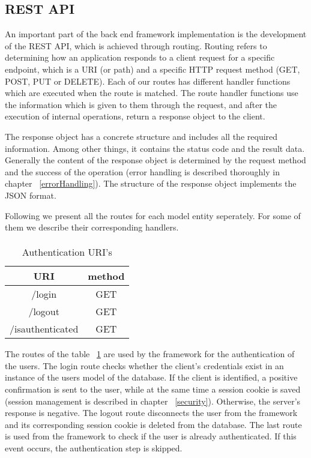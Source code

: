 \subsection{REST API}
An important part of the back end framework implementation is the development of the REST API, which is achieved through routing. Routing refers to determining how an application responds to a client request for a specific endpoint, which is a URI (or path) and a specific HTTP request method (GET, POST, PUT or DELETE). Each of our routes has different handler functions which are executed when the route is matched. The route handler functions use the information which is given to them through the request, and after the execution of internal operations, return a response object to the client.\par
	 The response object has a concrete structure and includes all the required information. Among other things, it contains the status code and the result data. Generally the content of the response object is determined by the request method and the success of the operation (error handling is described thoroughly in chapter ~\ref{errorHandling}). The structure of the response object implements the JSON format. \par 
	 	Following we present all the routes for each model entity seperately. For some of them we describe their corresponding handlers.
	 	
\paragraph{}
\begin{table}[]
\centering
\begin{tabular}{|c|c|}
\hline
\rowcolor[HTML]{32CB00} 
\textbf{URI}     & \textbf{method} \\ \hline
\rowcolor[HTML]{FFFFFF} 
/login           & GET             \\ \hline
\rowcolor[HTML]{67FD9A} 
/logout          & GET             \\ \hline
\rowcolor[HTML]{FFFFFF} 
/isauthenticated & GET             \\ \hline
\end{tabular}
\caption{Authentication URI's}
\label{authURI}
\end{table}
The routes of the table ~\ref{authURI} are used by the framework for the authentication of the users. The login route checks whether the client's credentials exist in an instance of the users model of the database. If the client is identified, a positive confirmation is sent to the user, while at the same time a session cookie is saved (session management is described in chapter ~\ref{security}). Otherwise, the server's response is negative. The logout route disconnects the user from the framework and its corresponding session cookie is deleted from the database. The last route is used from the framework to check if the user is already authenticated. If this event occurs, the authentication step is skipped.

